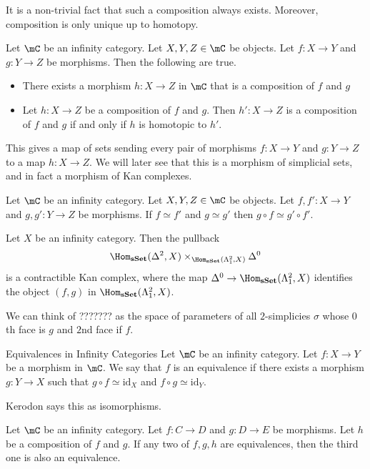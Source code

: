 \documentclass[a4paper]{article}
\begin{document}
It is a non-trivial fact that such a composition always exists. Moreover, composition is only unique up to homotopy. 

\begin{prp}{}{} Let $\mC$ be an infinity category. Let $X,Y,Z\in\mC$ be objects. Let $f:X\to Y$ and $g:Y\to Z$ be morphisms. Then the following are true. 
\begin{itemize}
\item There exists a morphism $h:X\to Z$ in $\mC$ that is a composition of $f$ and $g$
\item Let $h:X\to Z$ be a composition of $f$ and $g$. Then $h':X\to Z$ is a composition of $f$ and $g$ if and only if $h$ is homotopic to $h'$. 
\end{itemize}
\end{prp}

This gives a map of sets sending every pair of morphisms $f:X\to Y$ and $g:Y\to Z$ to a map $h:X\to Z$. We will later see that this is a morphism of simplicial sets, and in fact a morphism of Kan complexes. 

\begin{prp}{}{} Let $\mC$ be an infinity category. Let $X,Y,Z\in\mC$ be objects. Let $f,f':X\to Y$ and $g,g':Y\to Z$ be morphisms. If $f\simeq f'$ and $g\simeq g'$ then $g\circ f\simeq g'\circ f'$. 
\end{prp}

\begin{crl}{}{} Let $X$ be an infinity category. Then the pullback $$\Hom_\bold{sSet}(\Delta^2,X)\times_{\Hom_\bold{sSet}(\Lambda_1^2,X)}\Delta^0$$ is a contractible Kan complex, where the map $\Delta^0\to\Hom_\bold{sSet}(\Lambda_1^2,X)$ identifies the object $(f,g)$ in $\Hom_\bold{sSet}(\Lambda_1^2,X)$. 
\end{crl}

We can think of ??????? as the space of parameters of all $2$-simplicies $\sigma$ whose $0$th face is $g$ and $2$nd face if $f$. 

\begin{defn}{Equivalences in Infinity Categories}{} Let $\mC$ be an infinity category. Let $f:X\to Y$ be a morphism in $\mC$. We say that $f$ is an equivalence if there exists a morphism $g:Y\to X$ such that $g\circ f\simeq\text{id}_X$ and $f\circ g\simeq\text{id}_Y$. 
\end{defn}

Kerodon says this as isomorphisms. 

\begin{prp}{}{} Let $\mC$ be an infinity category. Let $f:C\to D$ and $g:D\to E$ be morphisms. Let $h$ be a composition of $f$ and $g$. If any two of $f,g,h$ are equivalences, then the third one is also an equivalence. 
\end{prp}
\end{document}
